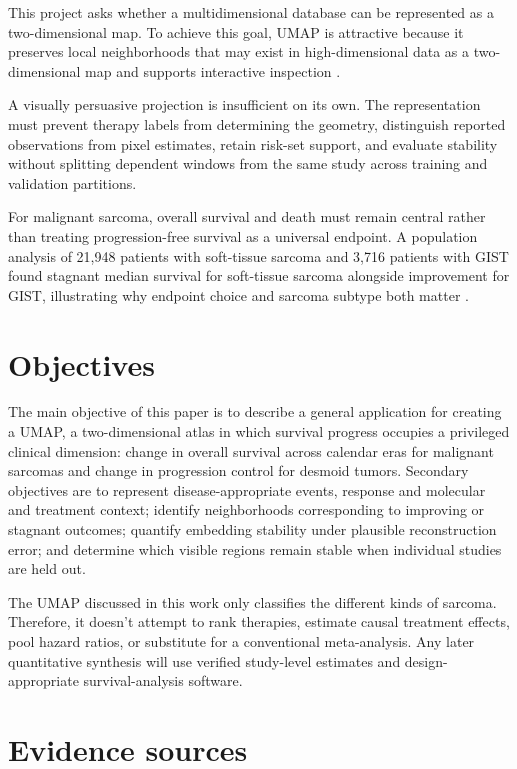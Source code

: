 \documentclass[17pt]{extarticle}
\begin{document}
This project asks whether a multidimensional database can be represented as a two-dimensional map. To achieve this goal, UMAP is attractive because it preserves local neighborhoods that may exist in high-dimensional data as a two-dimensional map and supports interactive inspection \citep{mcinnes2018umap}. 

A visually persuasive projection is insufficient on its own. The representation must prevent therapy labels from determining the geometry, distinguish reported observations from pixel estimates, retain risk-set support, and evaluate stability without splitting dependent windows from the same study across training and validation partitions.

For malignant sarcoma, overall survival and death must remain central rather than treating progression-free survival as a universal endpoint. A population analysis of 21,948 patients with soft-tissue sarcoma and 3,716 patients with GIST found stagnant median survival for soft-tissue sarcoma alongside improvement for GIST, illustrating why endpoint choice and sarcoma subtype both matter \citep{hardy2025sts}.


\section{Objectives}

The main objective of this paper is to describe a general application for creating a UMAP, a two-dimensional atlas in which survival progress occupies a privileged clinical dimension: change in overall survival across calendar eras for malignant sarcomas and change in progression control for desmoid tumors. Secondary objectives are to represent disease-appropriate events, response and molecular and treatment context; identify neighborhoods corresponding to improving or stagnant outcomes; quantify embedding stability under plausible reconstruction error; and determine which visible regions remain stable when individual studies are held out.

The UMAP discussed in this work only classifies the different kinds of sarcoma. Therefore, it doesn't attempt to rank therapies, estimate causal treatment effects, pool hazard ratios, or substitute for a conventional meta-analysis. Any later quantitative synthesis will use verified study-level estimates and design-appropriate survival-analysis software.


\section{Evidence sources}
\end{document}
